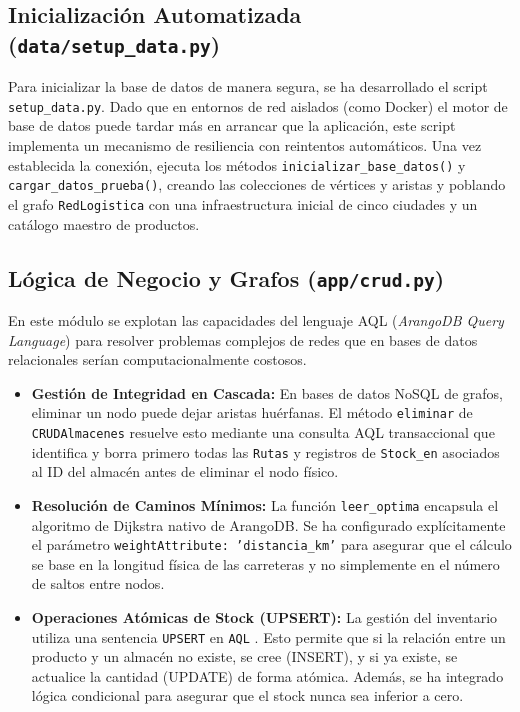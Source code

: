\subsection{Inicialización Automatizada (\texttt{data/setup\_data.py})}
Para inicializar la base de datos de manera segura, se ha desarrollado el script \texttt{setup\_data.py}. Dado que en entornos de red aislados (como Docker) el motor de base de datos puede tardar más en arrancar que la aplicación, este script implementa un mecanismo de resiliencia con reintentos automáticos. Una vez establecida la conexión, ejecuta los métodos \texttt{inicializar\_base\_datos()} y \texttt{cargar\_datos\_prueba()}, creando las colecciones de vértices y aristas y poblando el grafo \texttt{RedLogistica} con una infraestructura inicial de cinco ciudades y un catálogo maestro de productos.

\subsection{Lógica de Negocio y Grafos (\texttt{app/crud.py})}
En este módulo se explotan las capacidades del lenguaje AQL (\textit{ArangoDB Query Language}) para resolver problemas complejos de redes que en bases de datos relacionales serían computacionalmente costosos.

\begin{itemize}
    \item \textbf{Gestión de Integridad en Cascada:} En bases de datos NoSQL de grafos, eliminar un nodo puede dejar aristas huérfanas. El método \texttt{eliminar} de \texttt{CRUDAlmacenes} resuelve esto mediante una consulta AQL transaccional que identifica y borra primero todas las \texttt{Rutas} y registros de \texttt{Stock\_en} asociados al ID del almacén antes de eliminar el nodo físico.
    
    \item \textbf{Resolución de Caminos Mínimos:} La función \texttt{leer\_optima} encapsula el algoritmo de Dijkstra nativo de ArangoDB. Se ha configurado explícitamente el parámetro \texttt{weightAttribute: 'distancia\_km'} para asegurar que el cálculo se base en la longitud física de las carreteras y no simplemente en el número de saltos entre nodos.
    
    \item \textbf{Operaciones Atómicas de Stock (UPSERT):} La gestión del inventario utiliza una sentencia \texttt{UPSERT} en \texttt{AQL} \cite{aql_manual}. Esto permite que si la relación entre un producto y un almacén no existe, se cree (INSERT), y si ya existe, se actualice la cantidad (UPDATE) de forma atómica. Además, se ha integrado lógica condicional para asegurar que el stock nunca sea inferior a cero.
\end{itemize}


